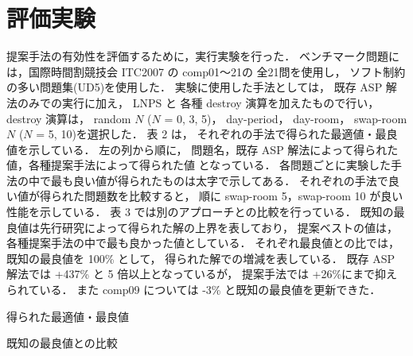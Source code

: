 \section{評価実験}
提案手法の有効性を評価するために，実行実験を行った．
ベンチマーク問題には，国際時間割競技会 ITC2007 の comp01〜21の
全21問を使用し，
ソフト制約の多い問題集(UD5)を使用した．
実験に使用した手法としては，
既存 ASP 解法のみでの実行に加え，
LNPS と 各種 destroy 演算を加えたもので行い，
destroy 演算は，
random $N$ ($N$ = 0, 3, 5)，
day-period，
day-room，
swap-room $N$ ($N$ = 5, 10)を選択した．
表 2 は，
それぞれの手法で得られた最適値・最良値を示している．
左の列から順に，
問題名，既存 ASP 解法によって得られた値，各種提案手法によって得られた値
となっている．
各問題ごとに実験した手法の中で最も良い値が得られたものは太字で示してある．
それぞれの手法で良い値が得られた問題数を比較すると，
順に swap-room 5，swap-room 10 が良い性能を示している．
表 3 では別のアプローチとの比較を行っている．
既知の最良値は先行研究によって得られた解の上界を表しており，
提案ベストの値は，
各種提案手法の中で最も良かった値としている．
それぞれ最良値との比では，
既知の最良値を 100\% として，
得られた解での増減を表している．
既存 ASP 解法では +437\% と 5 倍以上となっているが，
提案手法では +26\%にまで抑えられている．
また comp09 については -3\% と既知の最良値を更新できた．

\begin{table*}[tbp]
  \label{table:bench:result1}
  \begin{center}
  \caption{得られた最適値・最良値}
\begin{tableA}
    
  \end{tableA}
  \end{center}
\end{table*}

\begin{table*}[tbp]
  \label{table:bench:result2}
  \centering
   \caption{既知の最良値との比較}
  \begin{tableB}
    
  \end{tableB}
\end{table*}